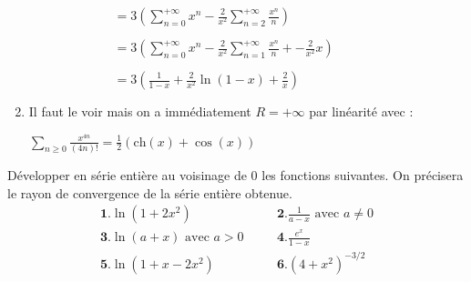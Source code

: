 \documentclass{book}
\begin{document}
\begin{Exercice}
\begin{Correction}
\begin{enumerate}
\begin{itemize}
\hspace{0.7cm} $\phantom{  \sum\limits_{n = 0}^{ + \infty }  \frac{3n }{n+2}   }  =    
3 \left( \sum\limits_{n = 0}^{ + \infty } x^n  -  \frac{2}{x^2} \sum\limits_{ n = 2 }^{ + \infty } \frac{ x^{n} }{ n }  \right)$

\hspace{0.7cm} $\phantom{  \sum\limits_{n = 0}^{ + \infty }  \frac{3n }{n+2}   }  =    
3 \left( \sum\limits_{n = 0}^{ + \infty } x^n  -  \frac{2}{x^2} \sum\limits_{ n = 1 }^{ + \infty } \frac{ x^{n} }{ n } + -  \frac{2}{x^2} x   \right)$

\hspace{0.7cm} $\phantom{  \sum\limits_{n = 0}^{ + \infty }  \frac{3n }{n+2}   }  =    
3 \left(  \frac{1}{1-x}  + \frac{2}{x^2} \ln(1-x) +  \frac{2}{x}   \right)$
    \end{itemize}		
	
	\item %
	Il faut le voir mais on a immédiatement $R = + \infty$ par linéarité avec :
	
	\hspace{0.7cm}$ \sum\limits_{n \geqslant 0} \frac{x^{4n} }{ (4n)! } = \tfrac{1}{2} \left( \mathrm{ch}(x) + \cos(x) \right)$
	
 \end{enumerate} 
\end{Correction}
\end{Exercice} 

\begin{Exercice}[DSE en 0]
Développer en série entière au voisinage de 0 les fonctions suivantes. On précisera le rayon de convergence de la série entière obtenue.
$$\begin{array}{lcl}
\mathbf{1.}\ln(1+2x^2)&\quad&\mathbf{2.}\displaystyle \frac{1}{a-x}\textrm{ avec }a\neq 0\\
\mathbf{3.}\ln(a+x) \textrm{ avec }a> 0&\quad&\mathbf{4.}\displaystyle \frac{e^x}{1-x}\\
\mathbf{5.}\ln(1+x-2x^2)&\quad&\mathbf{6.}\displaystyle(4+x^2)^{-3/2}
\end{array}$$
\begin{Correction}
\end{Correction}
\end{Exercice}
\end{document}
